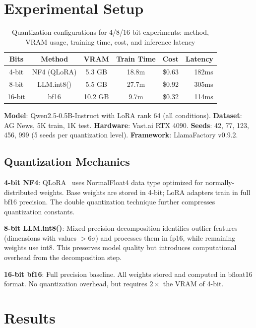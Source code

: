 \documentclass[journal]{IEEEtran}
\begin{document}
\section{Experimental Setup}

\begin{table}[!ht]
\centering\caption{Quantization configurations for 4/8/16-bit experiments: method, VRAM usage, training time, cost, and inference latency}
\label{tab:config}
\begin{tabular}{ccccrr}
\toprule \textbf{Bits} & \textbf{Method} & \textbf{VRAM} & \textbf{Train Time} & \textbf{Cost} & \textbf{Latency} \\
\midrule
4-bit & NF4 (QLoRA) & 5.3 GB & 18.8m & \$0.63 & 182ms \\
8-bit & LLM.int8() & 5.5 GB & 27.7m & \$0.92 & 305ms \\
16-bit & bf16 & 10.2 GB & 9.7m & \$0.32 & 114ms \\
\bottomrule
\end{tabular}
\end{table}

\textbf{Model}: Qwen2.5-0.5B-Instruct with LoRA rank 64 (all conditions). \textbf{Dataset}: AG News, 5K train, 1K test. \textbf{Hardware}: Vast.ai RTX 4090. \textbf{Seeds}: 42, 77, 123, 456, 999 (5 seeds per quantization level). \textbf{Framework}: LlamaFactory v0.9.2.

\subsection{Quantization Mechanics}
\textbf{4-bit NF4}: QLoRA~\cite{dettmers2023} uses NormalFloat4 data type optimized for normally-distributed weights. Base weights are stored in 4-bit; LoRA adapters train in full bf16 precision. The double quantization technique further compresses quantization constants.

\textbf{8-bit LLM.int8()}: Mixed-precision decomposition identifies outlier features (dimensions with values $>6\sigma$) and processes them in fp16, while remaining weights use int8. This preserves model quality but introduces computational overhead from the decomposition step.

\textbf{16-bit bf16}: Full precision baseline. All weights stored and computed in bfloat16 format. No quantization overhead, but requires $2\times$ the VRAM of 4-bit.

\section{Results}
\end{document}
